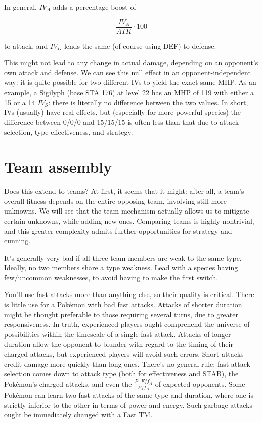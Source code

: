 In general, $IV_A$ adds a percentage boost of

\[ \frac{IV_A}{ATK} \cdot 100 \]

\noindent{}to attack, and $IV_D$ lends the same (of course using DEF) to defense.

This might not lead to any change in actual damage, depending on
  an opponent's own attack and defense.
We can see this null effect in an opponent-independent way: it is quite possible
  for two different IVs to yield the exact same MHP.
As an example, a Sigilyph (base STA 176) at level 22 has an MHP of 119 with
  either a 15 or a 14 $IV_S$: there is literally no difference between the
  two values.
In short, IVs (usually) have real effects, but (especially for more powerful species)
  the difference between 0/0/0 and 15/15/15 is often less than that due to
  attack selection, type effectiveness, and strategy.

\section{Team assembly}
Does this extend to teams?
At first, it seems that it might: after all, a team's overall fitness
 depends on the entire opposing team, involving still more unknowns.
We will see that the team mechanism actually allows us to mitigate certain
 unknowns, while adding new ones.
Comparing teams is highly nontrivial, and this greater complexity admits
 further opportunities for strategy and cunning.

It's generally very bad if all three team members are weak to the same type.
Ideally, no two members share a type weakness.
Lead with a species having few/uncommon weaknesses, to avoid having to make the first switch.

You'll use fast attacks more than anything else, so their quality is critical.
There is little use for a Pokémon with bad fast attacks.
Attacks of shorter duration might be thought preferable to those requiring
  several turns, due to greater responsiveness.
In truth, experienced players ought comprehend the universe of possibilities
  within the timescale of a single fast attack.
Attacks of longer duration allow the opponent to blunder with regard to the
  timing of their charged attacks, but experienced players will avoid
  such errors.
Short attacks credit damage more quickly than long ones.
There's no general rule: fast attack selection comes down to attack type
  (both for effectiveness and STAB), the Pokémon's charged attacks,
  and even the $\frac{P \cdot Eff_A}{Eff_D}$ of expected opponents.
Some Pokémon can learn two fast attacks of the same type and duration,
  where one is strictly inferior to the other in terms of power and
  energy.
Such garbage attacks ought be immediately changed with a Fast TM\@.

